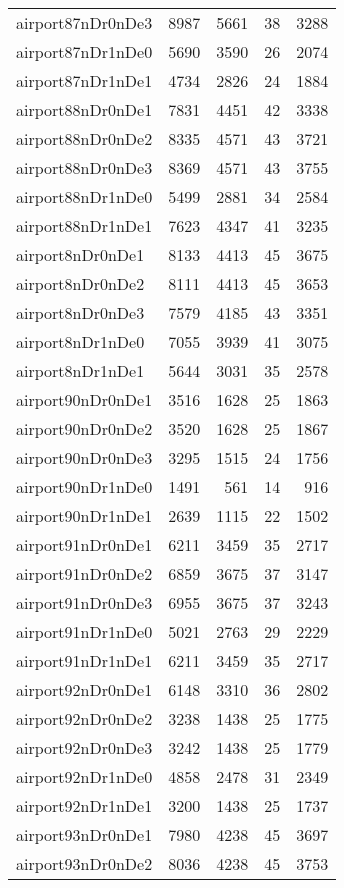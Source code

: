 \begin{longtable}{lrrrr}
airport87nDr0nDe3 & 8987 & 5661 & 38 & 3288 \\
airport87nDr1nDe0 & 5690 & 3590 & 26 & 2074 \\
airport87nDr1nDe1 & 4734 & 2826 & 24 & 1884 \\
airport88nDr0nDe1 & 7831 & 4451 & 42 & 3338 \\
airport88nDr0nDe2 & 8335 & 4571 & 43 & 3721 \\
airport88nDr0nDe3 & 8369 & 4571 & 43 & 3755 \\
airport88nDr1nDe0 & 5499 & 2881 & 34 & 2584 \\
airport88nDr1nDe1 & 7623 & 4347 & 41 & 3235 \\
airport8nDr0nDe1 & 8133 & 4413 & 45 & 3675 \\
airport8nDr0nDe2 & 8111 & 4413 & 45 & 3653 \\
airport8nDr0nDe3 & 7579 & 4185 & 43 & 3351 \\
airport8nDr1nDe0 & 7055 & 3939 & 41 & 3075 \\
airport8nDr1nDe1 & 5644 & 3031 & 35 & 2578 \\
airport90nDr0nDe1 & 3516 & 1628 & 25 & 1863 \\
airport90nDr0nDe2 & 3520 & 1628 & 25 & 1867 \\
airport90nDr0nDe3 & 3295 & 1515 & 24 & 1756 \\
airport90nDr1nDe0 & 1491 & 561 & 14 & 916 \\
airport90nDr1nDe1 & 2639 & 1115 & 22 & 1502 \\
airport91nDr0nDe1 & 6211 & 3459 & 35 & 2717 \\
airport91nDr0nDe2 & 6859 & 3675 & 37 & 3147 \\
airport91nDr0nDe3 & 6955 & 3675 & 37 & 3243 \\
airport91nDr1nDe0 & 5021 & 2763 & 29 & 2229 \\
airport91nDr1nDe1 & 6211 & 3459 & 35 & 2717 \\
airport92nDr0nDe1 & 6148 & 3310 & 36 & 2802 \\
airport92nDr0nDe2 & 3238 & 1438 & 25 & 1775 \\
airport92nDr0nDe3 & 3242 & 1438 & 25 & 1779 \\
airport92nDr1nDe0 & 4858 & 2478 & 31 & 2349 \\
airport92nDr1nDe1 & 3200 & 1438 & 25 & 1737 \\
airport93nDr0nDe1 & 7980 & 4238 & 45 & 3697 \\
airport93nDr0nDe2 & 8036 & 4238 & 45 & 3753 \\

\end{longtable}
